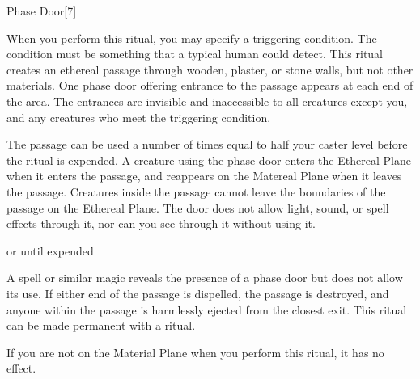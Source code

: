 \begin{spellsection}{Phase Door}[7]
    \begin{spellheader}
    \end{spellheader}
    \begin{spellcontent}
        \begin{spelltargetinginfo}
        \end{spelltargetinginfo}
        \begin{spelleffects}

            \spellspecial When you perform this ritual, you may specify a triggering condition. The condition must be something that a typical human could detect.
            \spellline
            \spelleffect This ritual creates an ethereal passage through wooden, plaster, or stone walls, but not other materials. One phase door offering entrance to the passage appears at each end of the area. The entrances are invisible and inaccessible to all creatures except you, and any creatures who meet the triggering condition.

            The passage can be used a number of times equal to half your caster level before the ritual is expended. A creature using the phase door enters the Ethereal Plane when it enters the passage, and reappears on the Matereal Plane when it leaves the passage. Creatures inside the passage cannot leave the boundaries of the passage on the Ethereal Plane. The door does not allow light, sound, or spell effects through it, nor can you see through it without using it.

            \spelldur \durext or until expended
        \end{spelleffects}
    \end{spellcontent}
    \begin{spellfooter}
        \spellnotes A  spell or similar magic reveals the presence of a phase door but does not allow its use. If either end of the passage is dispelled, the passage is destroyed, and anyone within the passage is harmlessly ejected from the closest exit. This ritual can be made permanent with a  ritual.

        If you are not on the Material Plane when you perform this ritual, it has no effect.
    \end{spellfooter}
\end{spellsection}

